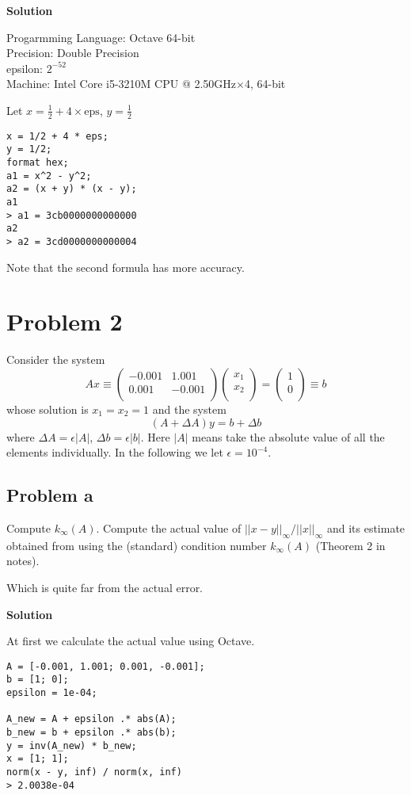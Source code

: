 \documentclass[12pt,oneside,a4paper]{article}
\newcommand{\problem}[1]
{
    \clearpage
    \section*{Problem {#1}}
}
\newcommand{\subproblem}[1]
{
    \subsection*{Problem {#1}}
}
\newcommand{\solution}
{
    \vspace{15pt}
    \noindent\ignorespaces\textbf{\large Solution}\par
}
\begin{document}
\solution

Progarmming Language: Octave 64-bit\\
Precision: Double Precision\\
epsilon: $2^{-52}$\\
Machine: Intel Core i5-3210M CPU @ 2.50GHz$\times$4, 64-bit\par

Let $x = \frac{1}{2} + 4\times \mathrm{eps}$, $y = \frac{1}{2}$

\begin{verbatim}
x = 1/2 + 4 * eps;
y = 1/2;
format hex;
a1 = x^2 - y^2;
a2 = (x + y) * (x - y);
a1
> a1 = 3cb0000000000000
a2
> a2 = 3cd0000000000004
\end{verbatim}

Note that the second formula has more accuracy.

\problem{2}
Consider the system
$$Ax \equiv \begin{pmatrix}
  -0.001 & 1.001\\
  0.001  & -0.001\\
 \end{pmatrix} \begin{pmatrix}
  x_{1}\\
  x_{2}\\
 \end{pmatrix} = \begin{pmatrix}
  1\\
  0\\
 \end{pmatrix} \equiv b$$
whose solution is $x_{1} = x_{2} = 1$ and the system 
$$(A + \Delta A)y = b + \Delta b$$
where $\Delta A = \epsilon |A|$, $\Delta b = \epsilon |b|$. Here $|A|$ means take the absolute value of all the elements individually. In the following we let $\epsilon = 10^{-4}$.

\subproblem{a}
Compute $k_{\infty}(A)$. Compute the actual value of $||x-y||_{\infty} / ||x||_{\infty}$ and its estimate obtained from using the (standard) condition number $k_{\infty}(A)$ (Theorem 2 in notes).\par
Which is quite far from the actual error.

\solution
At first we calculate the actual value using Octave.

\begin{verbatim}
A = [-0.001, 1.001; 0.001, -0.001];
b = [1; 0];
epsilon = 1e-04;

A_new = A + epsilon .* abs(A);
b_new = b + epsilon .* abs(b);
y = inv(A_new) * b_new;
x = [1; 1];
norm(x - y, inf) / norm(x, inf)
> 2.0038e-04
\end{verbatim}
\end{document}
